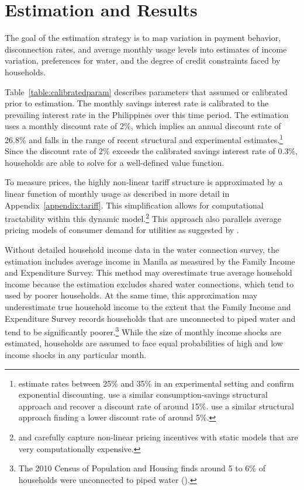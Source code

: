 \documentclass[12pt]{article}
\begin{document}
\section{Estimation and Results}    %

The goal of the estimation strategy is to map variation in payment behavior, disconnection rates, and average monthly usage levels into estimates of income variation, preferences for water, and the degree of credit constraints faced by households.  

Table~\ref{table:calibratedparam} describes parameters that assumed or calibrated prior to estimation.  The monthly savings interest rate is calibrated to the prevailing interest rate in the Philippines over this time period.  The estimation uses a monthly discount rate of 2\%, which implies an annual discount rate of 26.8\% and falls in the range of recent structural and experimental estimates.\footnote{\cite{andreoni2012estimating} estimate rates between 25\% and 35\% in an experimental setting and confirm exponential discounting.  \cite{laibson2007estimating} use a similar consumption-savings structural approach and recover a discount rate of around 15\%.  \cite{gourinchas2002consumption} use a similar structural approach finding a lower discount rate of around 5\%.}  Since the discount rate of 2\% exceeds the calibrated savings interest rate of 0.3\%, households are able to solve for a well-defined value function.

To measure prices, the highly non-linear tariff structure is approximated by a linear function of monthly usage as described in more detail in Appendix~\ref{appendix:tariff}.  This simplification allows for computational tractability within this dynamic model.\footnote{\cite{wjv} and \cite{szabo2015value} carefully capture non-linear pricing incentives with static models that are very computationally expensive.}  This approach also parallels average pricing models of consumer demand for utilities as suggested by \cite{ito2014consumers}.  

Without detailed household income data in the water connection survey, the estimation includes average income in Manila as measured by the Family Income and Expenditure Survey.  This method may overestimate true average household income because the estimation excludes shared water connections, which tend to used by poorer households.  At the same time, this approximation may underestimate true household income to the extent that the Family Income and Expenditure Survey records households that are unconnected to piped water and tend to be significantly poorer.\footnote{The 2010 Census of Population and Housing finds around 5 to 6\% of households were unconnected to piped water (\cite{wjv}).}  While the size of monthly income shocks are estimated, households are assumed to face equal probabilities of high and low income shocks in any particular month.
\end{document}
